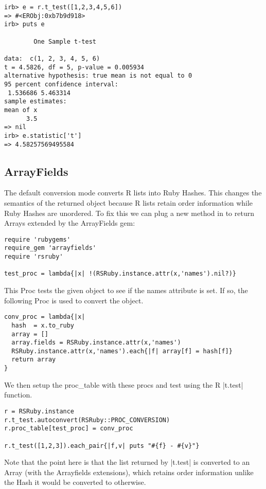 \documentclass[a4paper,12pt]{book}
\begin{document}
\begin{Verbatim}
irb> e = r.t_test([1,2,3,4,5,6])
=> #<ERObj:0xb7b9d918>
irb> puts e

        One Sample t-test

data:  c(1, 2, 3, 4, 5, 6)
t = 4.5826, df = 5, p-value = 0.005934
alternative hypothesis: true mean is not equal to 0
95 percent confidence interval:
 1.536686 5.463314
sample estimates:
mean of x
      3.5
=> nil
irb> e.statistic['t']
=> 4.58257569495584
\end{Verbatim}

\subsection{ArrayFields}

The default conversion mode converts R lists into Ruby Hashes. This changes the semantics of the returned object because R lists retain order information while Ruby Hashes are unordered. To fix this we can plug a new method in to return Arrays extended by the ArrayFields gem:

\begin{Verbatim}
require 'rubygems'
require_gem 'arrayfields'
require 'rsruby'

test_proc = lambda{|x| !(RSRuby.instance.attr(x,'names').nil?)}
\end{Verbatim}

This Proc tests the given object to see if the names attribute is set. If so, the following Proc is used to convert the object.

\begin{Verbatim}
conv_proc = lambda{|x|
  hash  = x.to_ruby
  array = []
  array.fields = RSRuby.instance.attr(x,'names')
  RSRuby.instance.attr(x,'names').each{|f| array[f] = hash[f]}
  return array
}
\end{Verbatim}

We then setup the proc\_table with these procs and test using the R |t.test| function.

\begin{Verbatim}
r = RSRuby.instance
r.t_test.autoconvert(RSRuby::PROC_CONVERSION)
r.proc_table[test_proc] = conv_proc

r.t_test([1,2,3]).each_pair{|f,v| puts "#{f} - #{v}"}
\end{Verbatim}

Note that the point here is that the list returned by |t.test| is converted to an Array (with the Arrayfields extensions), which retains order information unlike the Hash it would be converted to otherwise.
\end{document}
